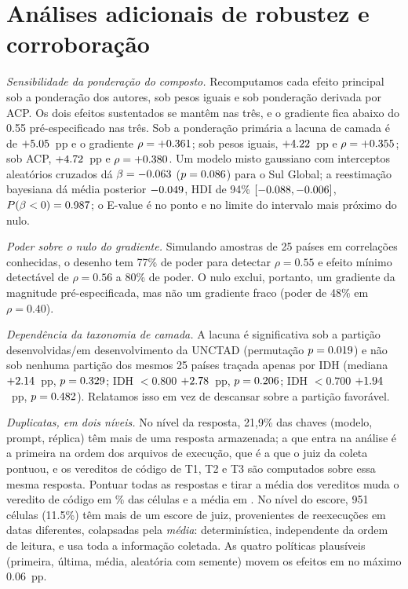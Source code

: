 \documentclass[11pt,a4paper]{article}
\begin{document}
\section{Análises adicionais de robustez e corroboração}\label{sec:s-extra}

\emph{Sensibilidade da ponderação do composto.} Recomputamos cada efeito
principal sob a ponderação dos autores, sob pesos iguais e sob ponderação derivada
por ACP. Os dois efeitos sustentados se mantêm nas três, e o gradiente fica
abaixo do 0.55 pré-especificado nas três. Sob a ponderação primária a lacuna de
camada é de $+5.05$~pp e o gradiente $\rho=+0.361$; sob pesos iguais, $+4.22$~pp
e $\rho=+0.355$; sob ACP, $+4.72$~pp e $\rho=+0.380$. Um modelo misto gaussiano
com interceptos aleatórios cruzados dá $\beta=-0.063$ ($p=0.086$) para o Sul
Global; a reestimação bayesiana dá média posterior $-0.049$, HDI de 94\%
$[-0.088,-0.006]$, $P(\beta<0)=0.987$; o E-value é \nevalue{} no ponto e \nevaluelim{} no
limite do intervalo mais próximo do nulo.

\emph{Poder sobre o nulo do gradiente.} Simulando amostras de 25 países em
correlações conhecidas, o desenho tem 77\% de poder para detectar $\rho=0.55$ e
efeito mínimo detectável de $\rho=0.56$ a 80\% de poder. O nulo exclui, portanto,
um gradiente da magnitude pré-especificada, mas não um gradiente fraco (poder de
48\% em $\rho=0.40$).

\emph{Dependência da taxonomia de camada.} A lacuna é significativa sob a
partição desenvolvidas/em desenvolvimento da UNCTAD (permutação $p=0.019$) e não
sob nenhuma partição dos mesmos 25 países traçada apenas por IDH (mediana
$+2.14$~pp, $p=0.329$; IDH $<0.800$ $+2.78$~pp, $p=0.206$; IDH $<0.700$
$+1.94$~pp, $p=0.482$). Relatamos isso
em vez de descansar sobre a partição favorável.

\emph{Duplicatas, em dois níveis.} No nível da resposta, 21,9\% das chaves
(modelo, prompt, réplica) têm mais de uma resposta armazenada; a que entra na
análise é a primeira na ordem dos arquivos de execução, que é a que o juiz da
coleta pontuou, e os vereditos de código de T1, T2 e T3 são computados sobre essa
mesma resposta. Pontuar todas as respostas e tirar a média dos vereditos muda o
veredito de código em \ndupchange\% das células e a média em \ndupmean. No nível do escore,
951 células (11.5\%) têm mais de um escore de juiz, provenientes de reexecuções
em datas diferentes, colapsadas pela \emph{média}: determinística, independente
da ordem de leitura, e usa toda a informação coletada. As quatro políticas
plausíveis (primeira, última, média, aleatória com semente) movem os efeitos em
no máximo 0.06~pp.
\end{document}
